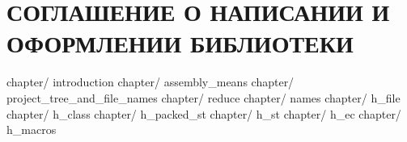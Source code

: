 \part{СОГЛАШЕНИЕ О НАПИСАНИИ И ОФОРМЛЕНИИ БИБЛИОТЕКИ}\label{logic:bib2}

	{chapter/}	{introduction}					%
	{chapter/}	{assembly_means}				%
	{chapter/}	{project_tree_and_file_names}	%
	{chapter/}	{reduce}						%
	{chapter/}	{names}							%
	{chapter/}	{h_file}						%
	{chapter/}	{h_class}						%
	{chapter/}	{h_packed_st}					%
	{chapter/}	{h_st}							%
	{chapter/}	{h_ec}							%
	{chapter/}	{h_macros}						%